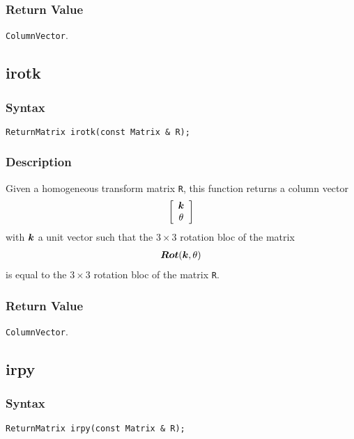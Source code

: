 \documentclass[11pt,fleqn,letterpaper]{report}
\newcommand{\mbold}[1]{\mbox{\boldmath $ #1 $}}
\newcommand{\matr}[2]{\left[\begin{array}{#1} #2 \end{array}\right]}
\begin{document}

\subsubsection*{Return Value}

{\tt ColumnVector}.

\newpage

\subsection*{irotk}
\subsubsection*{Syntax}
\begin{verbatim}
ReturnMatrix irotk(const Matrix & R);
\end{verbatim}
\subsubsection*{Description}
Given a homogeneous transform matrix {\tt R}, this function returns a column vector
\begin{eqnarray}
\matr{c}{\mbold{k} \\ \theta}
\end{eqnarray}
with $\mbold{k}$ a unit vector such that the $3 \times 3$ rotation bloc of the matrix
\begin{eqnarray}
\mbold{Rot}(\mbold{k}, \theta)
\end{eqnarray}
is equal to the $3 \times 3$ rotation bloc of the matrix {\tt R}.


\subsubsection*{Return Value}

{\tt ColumnVector}.

\newpage

\subsection*{irpy}
\subsubsection*{Syntax}
\begin{verbatim}
ReturnMatrix irpy(const Matrix & R);
\end{verbatim}
\end{document}
